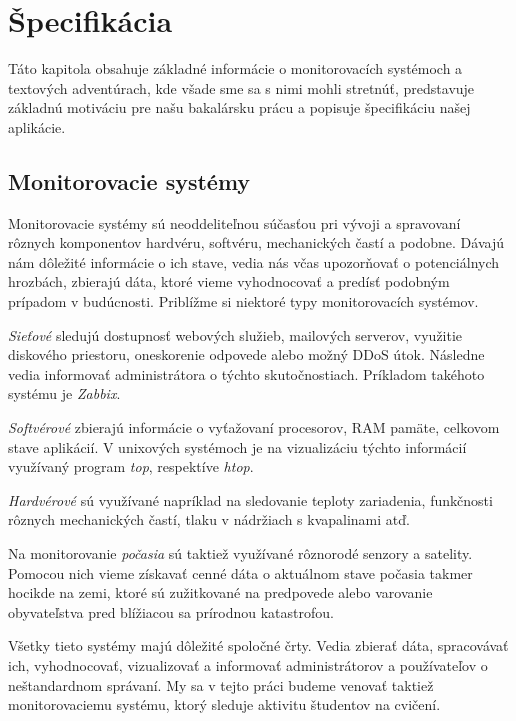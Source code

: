 \chapter{Špecifikácia}
\label{kap:specifikacia}

Táto kapitola obsahuje základné informácie o monitorovacích systémoch a textových
adventúrach, kde všade sme sa s nimi mohli stretnúť, predstavuje základnú motiváciu pre
našu bakalársku prácu a popisuje špecifikáciu našej aplikácie.

\section{Monitorovacie systémy}
\label{sec:monitorsystems}

Monitorovacie systémy sú neoddeliteľnou súčasťou pri vývoji a spravovaní rôznych
komponentov hardvéru, softvéru, mechanických častí a podobne. Dávajú nám dôležité
informácie o ich stave, vedia nás včas upozorňovať o potenciálnych hrozbách,
zbierajú dáta, ktoré vieme vyhodnocovať a predísť podobným prípadom v budúcnosti.
Priblížme si niektoré typy monitorovacích systémov.

\textit{Sieťové} sledujú dostupnosť webových služieb, mailových serverov, využitie
diskového priestoru, oneskorenie odpovede alebo možný DDoS útok. Následne vedia informovať administrátora o týchto skutočnostiach. Príkladom takéhoto systému je \textit{Zabbix}.
~\cite{bib:networkmonitoring}

\textit{Softvérové} zbierajú informácie o vyťažovaní procesorov, RAM pamäte, celkovom
stave aplikácií. V unixových systémoch je na vizualizáciu týchto informácií využívaný
program \textit{top}, respektíve \textit{htop}.

\textit{Hardvérové} sú využívané napríklad na sledovanie teploty zariadenia, funkčnosti rôznych mechanických častí, tlaku v nádržiach s kvapalinami atď. 

Na monitorovanie \textit{počasia} sú taktiež využívané rôznorodé senzory a satelity.
Pomocou nich vieme získavať cenné dáta o aktuálnom stave počasia takmer hocikde
na zemi, ktoré sú zužitkované na predpovede alebo varovanie obyvateľstva pred
blížiacou sa prírodnou katastrofou.

Všetky tieto systémy majú dôležité spoločné črty. Vedia zbierať dáta, spracovávať ich,
vyhodnocovať, vizualizovať a informovať administrátorov a používateľov o neštandardnom
správaní. My sa v tejto práci budeme venovať taktiež monitorovaciemu systému, ktorý sleduje aktivitu študentov na cvičení.

